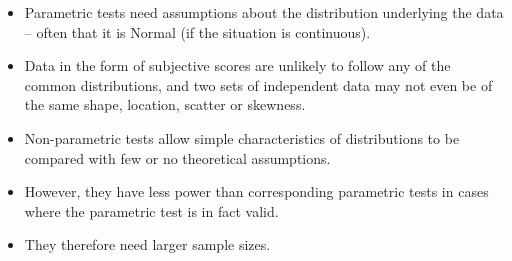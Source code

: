 \documentclass[a4paper,12pt]{article}
\begin{document}
\begin{itemize}
\item Parametric tests need assumptions about the distribution underlying the data  –  often that it is Normal (if the situation is continuous).  

    \item Data in the form of subjective scores are unlikely to follow any of the common distributions, and two sets of independent data may not even be of the same shape, location, scatter or skewness. 
    \item Non-parametric tests allow simple characteristics of distributions to be compared with few or no theoretical assumptions.  
    \item However, they have less power than corresponding parametric tests in cases where the parametric test is in fact valid.  
    \item They therefore need larger sample sizes. 
\end{itemize}
\end{document}
